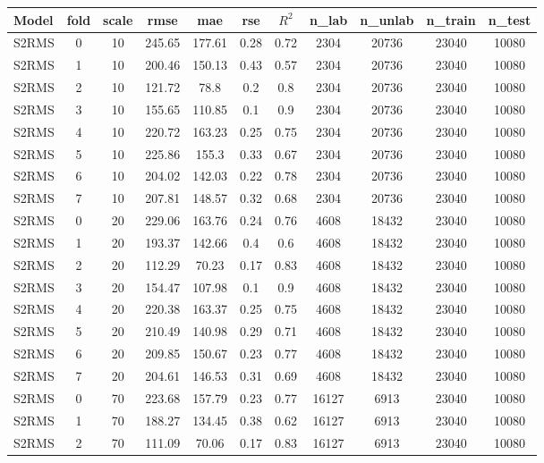 \documentclass{article}
\begin{document}
\begin{appendices}
\begin{longtable}{l c c c c c c c c c c}
\toprule
\textbf{Model} & \textbf{fold} & \textbf{scale} & \textbf{rmse} & \textbf{mae} & \textbf{rse} & \textbf{$R^2$} & \textbf{n\_lab} & \textbf{n\_unlab} & \textbf{n\_train} & \textbf{n\_test} \\
\midrule
S2RMS & 0 & 10 & 245.65 & 177.61 & 0.28 & 0.72 & 2304 & 20736 & 23040 & 10080 \\ 
S2RMS & 1 & 10 & 200.46 & 150.13 & 0.43 & 0.57 & 2304 & 20736 & 23040 & 10080 \\ 
S2RMS & 2 & 10 & 121.72 & 78.8 & 0.2 & 0.8 & 2304 & 20736 & 23040 & 10080 \\ 
S2RMS & 3 & 10 & 155.65 & 110.85 & 0.1 & 0.9 & 2304 & 20736 & 23040 & 10080 \\ 
S2RMS & 4 & 10 & 220.72 & 163.23 & 0.25 & 0.75 & 2304 & 20736 & 23040 & 10080 \\ 
S2RMS & 5 & 10 & 225.86 & 155.3 & 0.33 & 0.67 & 2304 & 20736 & 23040 & 10080 \\ 
S2RMS & 6 & 10 & 204.02 & 142.03 & 0.22 & 0.78 & 2304 & 20736 & 23040 & 10080 \\ 
S2RMS & 7 & 10 & 207.81 & 148.57 & 0.32 & 0.68 & 2304 & 20736 & 23040 & 10080 \\ 
S2RMS & 0 & 20 & 229.06 & 163.76 & 0.24 & 0.76 & 4608 & 18432 & 23040 & 10080 \\ 
S2RMS & 1 & 20 & 193.37 & 142.66 & 0.4 & 0.6 & 4608 & 18432 & 23040 & 10080 \\ 
S2RMS & 2 & 20 & 112.29 & 70.23 & 0.17 & 0.83 & 4608 & 18432 & 23040 & 10080 \\ 
S2RMS & 3 & 20 & 154.47 & 107.98 & 0.1 & 0.9 & 4608 & 18432 & 23040 & 10080 \\ 
S2RMS & 4 & 20 & 220.38 & 163.37 & 0.25 & 0.75 & 4608 & 18432 & 23040 & 10080 \\ 
S2RMS & 5 & 20 & 210.49 & 140.98 & 0.29 & 0.71 & 4608 & 18432 & 23040 & 10080 \\ 
S2RMS & 6 & 20 & 209.85 & 150.67 & 0.23 & 0.77 & 4608 & 18432 & 23040 & 10080 \\ 
S2RMS & 7 & 20 & 204.61 & 146.53 & 0.31 & 0.69 & 4608 & 18432 & 23040 & 10080 \\ 
S2RMS & 0 & 70 & 223.68 & 157.79 & 0.23 & 0.77 & 16127 & 6913 & 23040 & 10080 \\ 
S2RMS & 1 & 70 & 188.27 & 134.45 & 0.38 & 0.62 & 16127 & 6913 & 23040 & 10080 \\ 
S2RMS & 2 & 70 & 111.09 & 70.06 & 0.17 & 0.83 & 16127 & 6913 & 23040 & 10080 \\ 

\end{longtable}
\end{appendices}
\end{document}
